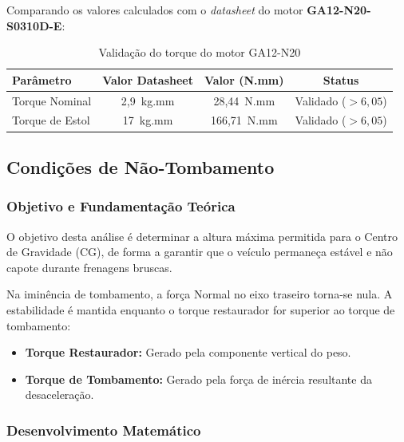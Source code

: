 Comparando os valores calculados com o \textit{datasheet} do motor \textbf{GA12-N20-S0310D-E}:

\begin{table}[htbp]
    \centering
    \caption{Validação do torque do motor GA12-N20}
    \label{tab:validacao-motor}
    \small
    \renewcommand{\arraystretch}{1.5}
    \begin{tabular}{|l|c|c|c|}
        \hline
        \textbf{Parâmetro} & \textbf{Valor Datasheet} & \textbf{Valor (N.mm)} & \textbf{Status} \\ \hline
        Torque Nominal     & 2,9~kg.mm                & 28,44~N.mm            & Validado ($> 6,05$) \\ \hline
        Torque de Estol    & 17~kg.mm                 & 166,71~N.mm           & Validado ($> 6,05$) \\ \hline
    \end{tabular}
\end{table}

\subsection{Condições de Não-Tombamento}

\subsubsection{Objetivo e Fundamentação Teórica}

O objetivo desta análise é determinar a altura máxima permitida para o Centro de Gravidade (CG), de forma a garantir que o veículo permaneça estável e não capote durante frenagens bruscas.

Na iminência de tombamento, a força Normal no eixo traseiro torna-se nula. A estabilidade é mantida enquanto o torque restaurador for superior ao torque de tombamento:

\begin{itemize}
    \item \textbf{Torque Restaurador:} Gerado pela componente vertical do peso.
    \item \textbf{Torque de Tombamento:} Gerado pela força de inércia resultante da desaceleração.
\end{itemize}

\subsubsection{Desenvolvimento Matemático}

